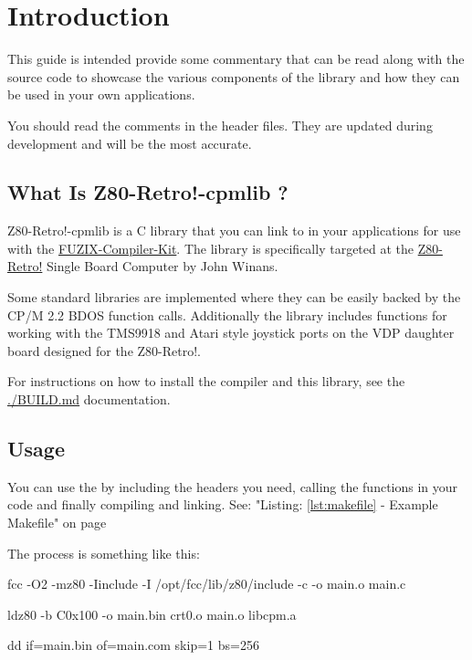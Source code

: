 \documentclass[10pt,a4paper]{article}
\title{\lib}
\author{David Latham}
\date{September, 2025}
\def\lib{Z80-Retro!-cpmlib }
\begin{document}
\maketitle
\tableofcontents
\pagebreak
\section{Introduction}

This guide is intended provide some commentary that can be read along with the
source code to showcase the various components of the library and how they can
be used in your own applications.

You should read the comments in the header files.  They are updated during
development and will be the most accurate.

\subsection{What Is \lib?}

\lib is a C library that you can link to in your applications for
use with the
\href{https://github.com/etchedpixels/fuzix-compiler-kit.git}{FUZIX-Compiler-Kit}.
The library is specifically targeted at the
\href{https://github.com/z80-retro}{Z80-Retro!} Single Board Computer by John
Winans.

Some standard libraries are implemented where they can be easily backed by the
CP/M 2.2 BDOS function calls.  Additionally the library includes functions for
working with the TMS9918 and Atari style joystick ports on the VDP daughter
board designed for the Z80-Retro!.

For instructions on how to install the compiler and this library, see the
\url{./BUILD.md} documentation.

\subsection{Usage}

You can use the by including the headers you need, calling the functions in
your code and finally compiling and linking. See: "Listing: \ref{lst:makefile}
- Example Makefile" on page \pageref{lst:makefile}

The process is something like this:

\begin{description}[font=$\bullet$~\normalfont\scshape\color{red!50!black}]
  \item[Compile] fcc -O2 -mz80 -Iinclude -I /opt/fcc/lib/z80/include -c -o
    main.o main.c
  \item[Link] ldz80 -b C0x100 -o main.bin crt0.o main.o libcpm.a
  \item[Truncate] dd if=main.bin of=main.com skip=1 bs=256
\end{description}
\end{document}

